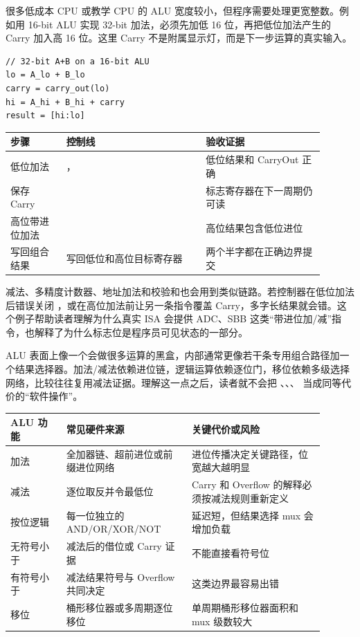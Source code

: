 很多低成本 CPU 或教学 CPU 的 ALU 宽度较小，但程序需要处理更宽整数。例如用 16-bit ALU 实现 32-bit 加法，必须先加低 16 位，再把低位加法产生的 Carry 加入高 16 位。这里 Carry 不是附属显示灯，而是下一步运算的真实输入。

\begin{lstlisting}
// 32-bit A+B on a 16-bit ALU
lo = A_lo + B_lo
carry = carry_out(lo)
hi = A_hi + B_hi + carry
result = [hi:lo]
\end{lstlisting}

\begin{longtable}{L{0.16\linewidth}L{0.4\linewidth}L{0.34\linewidth}}
\toprule
步骤 & 控制线 & 验收证据 \\
\midrule
低位加法 & ， & 低位结果和 CarryOut 正确 \\
保存 Carry &  & 标志寄存器在下一周期仍可读 \\
高位带进位加法 &  & 高位结果包含低位进位 \\
写回组合结果 & 写回低位和高位目标寄存器 & 两个半字都在正确边界提交 \\
\bottomrule
\end{longtable}

减法、多精度计数器、地址加法和校验和也会用到类似链路。若控制器在低位加法后错误关闭 ，或在高位加法前让另一条指令覆盖 Carry，多字长结果就会错。这个例子帮助读者理解为什么真实 ISA 会提供 ADC、SBB 这类“带进位加/减”指令，也解释了为什么标志位是程序员可见状态的一部分。

ALU 表面上像一个会做很多运算的黑盒，内部通常更像若干条专用组合路径加一个结果选择器。加法/减法依赖进位链，逻辑运算依赖逐位门，移位依赖多级选择网络，比较往往复用减法证据。理解这一点之后，读者就不会把 、、、 当成同等代价的“软件操作”。

\begin{longtable}{L{0.16\linewidth}L{0.36\linewidth}L{0.38\linewidth}}
\toprule
ALU 功能 & 常见硬件来源 & 关键代价或风险 \\
\midrule
加法 & 全加器链、超前进位或前缀进位网络 & 进位传播决定关键路径，位宽越大越明显 \\
减法 &  逐位取反并令最低位  & Carry 和 Overflow 的解释必须按减法规则重新定义 \\
按位逻辑 & 每一位独立的 AND/OR/XOR/NOT & 延迟短，但结果选择 mux 会增加负载 \\
无符号小于 & 减法后的借位或 Carry 证据 & 不能直接看符号位 \\
有符号小于 & 减法结果符号与 Overflow 共同决定 &  这类边界最容易出错 \\
移位 & 桶形移位器或多周期逐位移位 & 单周期桶形移位器面积和 mux 级数较大 \\
\bottomrule
\end{longtable}

